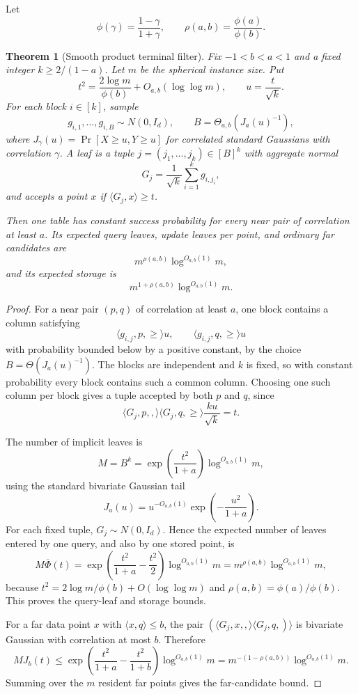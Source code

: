 \documentclass[10pt]{article}
\newtheorem{theorem}{Theorem}[section]
\theoremstyle{definition}
\newcommand{\ip}[2]{\langle #1,#2\rangle}
\begin{document}
Let
\[
   \phi(\gamma)=\frac{1-\gamma}{1+\gamma},
   \qquad
   \rho(a,b)=\frac{\phi(a)}{\phi(b)}.
\]

\begin{theorem}[Smooth product terminal filter]\label{thm:smooth-product-terminal}
   Fix $-1<b<a<1$ and a fixed integer $k\ge 2/(1-a)$. Let $m$ be the spherical instance size. Put
   \[
      t^2=\frac{2\log m}{\phi(b)}+O_{a,b}(\log\log m),
      \qquad
      u=\frac{t}{\sqrt k}.
   \]
   For each block $i\in[k]$, sample
   \[
      g_{i,1},\ldots,g_{i,B}\sim N(0,I_d),
      \qquad
      B=\Theta_{a,b}\!\left(J_a(u)^{-1}\right),
   \]
   where $J_\gamma(u)=\Pr[X\ge u,Y\ge u]$ for correlated standard Gaussians with correlation $\gamma$. A leaf is a tuple $j=(j_1,\ldots,j_k)\in[B]^k$ with aggregate normal
   \[
      G_j=\frac1{\sqrt k}\sum_{i=1}^k g_{i,j_i},
   \]
   and accepts a point $x$ if $\ip{G_j}{x}\ge t$.

   Then one table has constant success probability for every near pair of correlation at least $a$. Its expected query leaves, update leaves per point, and ordinary far candidates are
   \[
      m^{\rho(a,b)}\log^{O_{a,b}(1)}m,
   \]
   and its expected storage is
   \[
      m^{1+\rho(a,b)}\log^{O_{a,b}(1)}m.
   \]
\end{theorem}

\begin{proof}
   For a near pair $(p,q)$ of correlation at least $a$, one block contains a column satisfying
   \[
      \ip{g_{i,j},p}\ge u,
      \qquad
      \ip{g_{i,j},q}\ge u
   \]
   with probability bounded below by a positive constant, by the choice $B=\Theta(J_a(u)^{-1})$. The blocks are independent and $k$ is fixed, so with constant probability every block contains such a common column. Choosing one such column per block gives a tuple accepted by both $p$ and $q$, since
   \[
      \ip{G_j,p},\ip{G_j,q}\ge\frac{k u}{\sqrt k}=t.
   \]

   The number of implicit leaves is
   \[
      M=B^k
      =
      \exp\!\left(\frac{t^2}{1+a}\right)\log^{O_{a,b}(1)}m,
   \]
   using the standard bivariate Gaussian tail
   \[
      J_a(u)=u^{-O_{a,b}(1)}
      \exp\!\left(-\frac{u^2}{1+a}\right).
   \]
   For each fixed tuple, $G_j\sim N(0,I_d)$. Hence the expected number of leaves entered by one query, and also by one stored point, is
   \[
      M\overline\Phi(t)
      =
      \exp\!\left(\frac{t^2}{1+a}-\frac{t^2}{2}\right)
      \log^{O_{a,b}(1)}m
      =
      m^{\rho(a,b)}\log^{O_{a,b}(1)}m,
   \]
   because $t^2=2\log m/\phi(b)+O(\log\log m)$ and $\rho(a,b)=\phi(a)/\phi(b)$. This proves the query-leaf and storage bounds.

   For a far data point $x$ with $\ip{x}{q}\le b$, the pair $(\ip{G_j,x},\ip{G_j,q})$ is bivariate Gaussian with correlation at most $b$. Therefore
   \[
      M J_b(t)
      \le
      \exp\!\left(\frac{t^2}{1+a}-\frac{t^2}{1+b}\right)
      \log^{O_{a,b}(1)}m
      =
      m^{-(1-\rho(a,b))}\log^{O_{a,b}(1)}m.
   \]
   Summing over the $m$ resident far points gives the far-candidate bound.
\end{proof}
\end{document}
